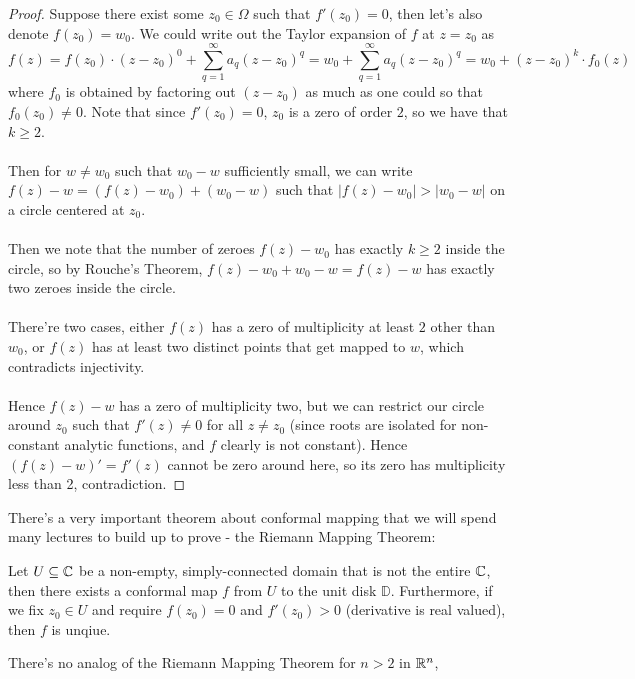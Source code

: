 \begin{proof}
    Suppose there exist some $z_0 \in \Omega$ such that $f'(z_0) = 0$, then let's also denote $f(z_0) = w_0$. We could write out the Taylor expansion of $f$ at $z = z_0$ as
    \[f(z) = f(z_0) \cdot (z - z_0)^0 + \sum_{q = 1}^\infty a_q (z - z_0)^q = w_0 + \sum_{q = 1}^\infty a_q (z - z_0)^q = w_0 + (z - z_0)^k \cdot f_0(z)\]
    where $f_0$ is obtained by factoring out $(z - z_0)$ as much as one could so that $f_0(z_0) \neq 0$. Note that since $f'(z_0) = 0$, $z_0$ is a zero of order $2$, so we have that $k \geq 2$.\\\\
    Then for $w \neq w_0$ such that $w_0 - w$ sufficiently small, we can write $f(z) - w = (f(z) - w_0) + (w_0 - w)$ such that $|f(z) - w_0| > |w_0 - w|$ on a circle centered at $z_0$.\\\\
    Then we note that the number of zeroes $f(z) - w_0$ has exactly $k \geq 2$ inside the circle, so by Rouche's Theorem, $f(z) - w_0 + w_0 - w = f(z) - w$ has exactly two zeroes inside the circle.\\\\
    There're two cases, either $f(z)$ has a zero of multiplicity at least $2$ other than $w_0$, or $f(z)$ has at least two distinct points that get mapped to $w$, which contradicts injectivity.\\\\
    Hence $f(z) - w$ has a zero of multiplicity two, but we can restrict our circle around $z_0$ such that $f'(z) \neq 0$ for all $z \neq z_0$ (since roots are isolated for non-constant analytic functions, and $f$ clearly is not constant). Hence $(f(z) - w)' = f'(z)$ cannot be zero around here, so its zero has multiplicity less than 2, contradiction.
\end{proof}

There's a very important theorem about conformal mapping that we will spend many lectures to build up to prove - the Riemann Mapping Theorem:

\begin{theorem}
    Let $U \subseteq \mathbb{C}$ be a non-empty, simply-connected domain that is not the entire $\mathbb{C}$, then there exists a conformal map $f$ from $U$ to the unit disk $\mathbb{D}$. Furthermore, if we fix $z_0 \in U$ and require $f(z_0) = 0$ and $f'(z_0) > 0$ (derivative is real valued), then $f$ is unqiue.
\end{theorem}

\begin{remark}
    There's no analog of the Riemann Mapping Theorem for $n > 2$ in $\mathbb{R}^n$,
\end{remark}

